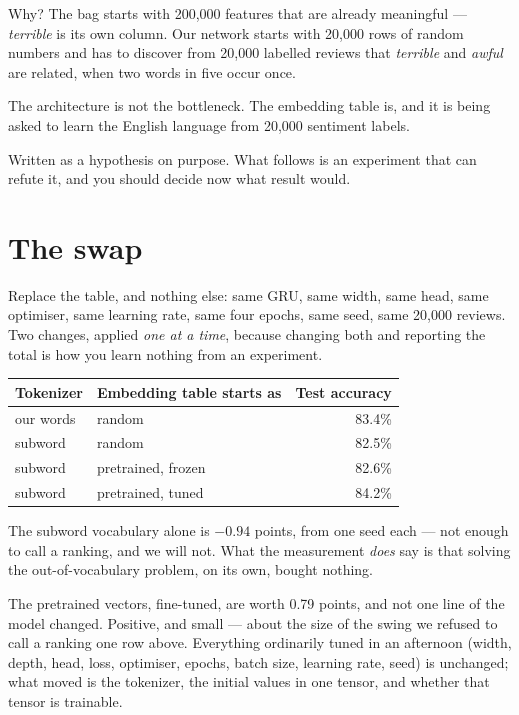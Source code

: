 \documentclass[11pt,a4paper]{article}
\begin{document}
Why? The bag starts with 200{,}000 features that are already meaningful ---
\emph{terrible} is its own column. Our network starts with 20{,}000 rows of
random numbers and has to discover from 20{,}000 labelled reviews that
\emph{terrible} and \emph{awful} are related, when two words in five occur
once.

\begin{keybox}[title={The hypothesis --- and it is only a hypothesis}]
The architecture is not the bottleneck. The embedding table is, and it is being
asked to learn the English language from 20{,}000 sentiment labels.

Written as a hypothesis on purpose. What follows is an experiment that can
refute it, and you should decide now what result would.
\end{keybox}

\section{The swap}

Replace the table, and nothing else: same GRU, same width, same head, same
optimiser, same learning rate, same four epochs, same seed, same 20{,}000
reviews. Two changes, applied \emph{one at a time}, because changing both and
reporting the total is how you learn nothing from an experiment.

\begin{center}
\small
\begin{tabular}{llr}
\toprule
\textbf{Tokenizer} & \textbf{Embedding table starts as} &
\textbf{Test accuracy} \\
\midrule
our words & random & 83.4\% \\
subword & random & 82.5\% \\
subword & pretrained, frozen & 82.6\% \\
subword & pretrained, tuned & 84.2\% \\
\bottomrule
\end{tabular}
\end{center}

The subword vocabulary alone is $-0.94$ points, from one seed each --- not
enough to call a ranking, and we will not. What the measurement \emph{does} say
is that solving the out-of-vocabulary problem, on its own, bought nothing.

The pretrained vectors, fine-tuned, are worth 0.79 points, and not one line of
the model changed. Positive, and small --- about the size of the swing we
refused to call a ranking one row above. Everything ordinarily tuned in an
afternoon (width, depth, head, loss, optimiser, epochs, batch size, learning
rate, seed) is unchanged; what moved is the tokenizer, the initial values in
one tensor, and whether that tensor is trainable.
\end{document}
